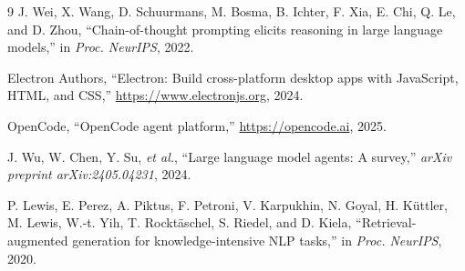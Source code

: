 \begin{thebibliography}{9}
 J. Wei, X. Wang, D. Schuurmans, M. Bosma,
B. Ichter, F. Xia, E. Chi, Q. Le, and D. Zhou, ``Chain-of-thought
prompting elicits reasoning in large language models,'' in
\emph{Proc. NeurIPS}, 2022.

 Electron Authors, ``Electron: Build cross-platform
desktop apps with JavaScript, HTML, and CSS,''
\url{https://www.electronjs.org}, 2024.

 OpenCode, ``OpenCode agent platform,''
\url{https://opencode.ai}, 2025.

 J. Wu, W. Chen, Y. Su, \emph{et al.},
``Large language model agents: A survey,'' \emph{arXiv preprint
arXiv:2405.04231}, 2024.

 P. Lewis, E. Perez, A. Piktus, F. Petroni,
V. Karpukhin, N. Goyal, H. K\"{u}ttler, M. Lewis, W.-t. Yih,
T. Rockt\"{a}schel, S. Riedel, and D. Kiela, ``Retrieval-augmented
generation for knowledge-intensive NLP tasks,'' in \emph{Proc.
NeurIPS}, 2020.

\end{thebibliography}


